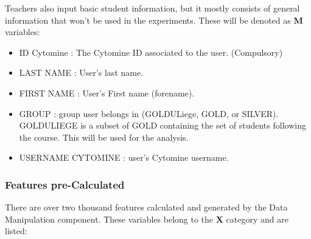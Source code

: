 \documentclass[a4paper,11pt]{report}
\numberwithin{figure}{section} %
\begin{document}
    Teachers also input basic student information, but it mostly consists of general information that won't be used in the experiments.
    These will be denoted as \textbf{M} variables:
   	\begin{itemize}
   	\item[\textbullet] ID Cytomine : The Cytomine ID associated to the user. (Compulsory)
    \item[\textbullet] LAST NAME : User's last name.
    \item[\textbullet] FIRST NAME : User's First name (forename).
    \item[\textbullet] GROUP : group user belongs in (GOLDULiege, GOLD, or SILVER).
    GOLDULIEGE is a subset of GOLD containing the set of students following the course.
    This will be used for the analysis.
    \item[\textbullet] USERNAME CYTOMINE : user's Cytomine username.
   	\end{itemize}
    
    
    \subsubsection{Features pre-Calculated}
    
    There are over two thousand features calculated and generated by the Data Manipulation component.
    These variables belong to the \textbf{X} category and are listed:
   
\end{document}

